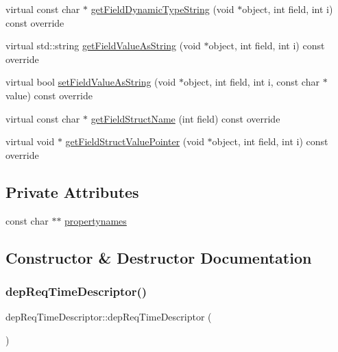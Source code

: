 \begin{DoxyCompactItemize}
\item 
virtual const char $\ast$ \hyperlink{classdepReqTimeDescriptor_a8c3f7004d1d8f89cbb01bd7e827f1ad8}{get\+Field\+Dynamic\+Type\+String} (void $\ast$object, int field, int i) const override
\item 
virtual std\+::string \hyperlink{classdepReqTimeDescriptor_a93ae2e8b0dece6757eabe758959988fd}{get\+Field\+Value\+As\+String} (void $\ast$object, int field, int i) const override
\item 
virtual bool \hyperlink{classdepReqTimeDescriptor_a03a2b4c17daaad8eb395d571279dde51}{set\+Field\+Value\+As\+String} (void $\ast$object, int field, int i, const char $\ast$value) const override
\item 
virtual const char $\ast$ \hyperlink{classdepReqTimeDescriptor_a5d68aab012514ac2d7f4649412b98ec0}{get\+Field\+Struct\+Name} (int field) const override
\item 
virtual void $\ast$ \hyperlink{classdepReqTimeDescriptor_a886868d18593658df92a25dd43eedcaf}{get\+Field\+Struct\+Value\+Pointer} (void $\ast$object, int field, int i) const override
\end{DoxyCompactItemize}
\subsection*{Private Attributes}
\begin{DoxyCompactItemize}
\item 
const char $\ast$$\ast$ \hyperlink{classdepReqTimeDescriptor_a8027018b5fe1aeb72652563cd2a9f505}{propertynames}
\end{DoxyCompactItemize}


\subsection{Constructor \& Destructor Documentation}
\mbox{\label{classdepReqTimeDescriptor_a3a2e6770051714ad9759ccbf1943dbff}} 
\subsubsection{\texorpdfstring{dep\+Req\+Time\+Descriptor()}{depReqTimeDescriptor()}}
{\footnotesize\ttfamily dep\+Req\+Time\+Descriptor\+::dep\+Req\+Time\+Descriptor (\begin{DoxyParamCaption}{ }\end{DoxyParamCaption})}

